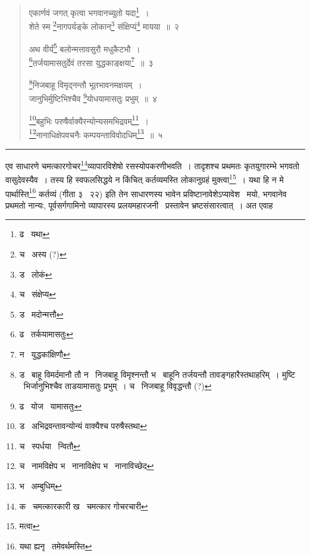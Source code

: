 \documentclass[11pt, openany]{book}
\begin{document}
\begin{quote}
{\na एकार्णवं जगत् कृत्वा भगवानच्युतो यदा\renewcommand{\thefootnote}{1}\footnote{ढ \textendash\ यथा}~।\\
शेते स्म \renewcommand{\thefootnote}{2}\footnote{च \textendash\ अस्य (?)}नागपर्यङ्के लोकान्\renewcommand{\thefootnote}{3}\footnote{ड \textendash\ लोकं} संक्षिप्यं\renewcommand{\thefootnote}{4}\footnote{च \textendash\ संक्षेप्य} मायया~॥~२

अथ वीर्यं\renewcommand{\thefootnote}{5}\footnote{ड \textendash\ मदोन्मत्तौ} बलोन्मत्तावसुरौ मधुकैटभौ~।\\
\renewcommand{\thefootnote}{6}\footnote{ढ \textendash\ तर्कयामासतुः}तर्जयामासतुर्देवं तरसा युद्धकाङ्क्षया\renewcommand{\thefootnote}{7}\footnote{न \textendash\ युद्धकांक्षिणौ}~॥~३

\renewcommand{\thefootnote}{8}\footnote{ड \textendash\ बाहू विमर्दमानौ तौ न \textendash\ निजबाहू विमृश्नन्तौ भ \textendash\ बाहूनि तर्जयन्तौ तावङ्गहारैस्तथाहरिम्~। मुष्टि \textendash\ भिर्जानुभिश्चैव ताडयामासतुः प्रभुम्~। च \textendash\ निजबाहू विवृद्धन्तौ (?)}निजबाहू विमृद्नन्तौ भूतभावनमक्षयम्~।\\
जानुभिर्मुष्टिभिश्चैव \renewcommand{\thefootnote}{9}\footnote{ढ \textendash\ योज \textendash\ यामासतुः}योधयामासतुः प्रभुम्~॥~४

\renewcommand{\thefootnote}{10}\footnote{ड \textendash\ अभिद्रवन्तावन्योन्यं वाक्यैश्च परुषैस्तथा}बहुभिः परुषैर्वाक्यैरन्योन्यसमभिद्रवम्\renewcommand{\thefootnote}{11}\footnote{च \textendash\ स्पर्धया \textendash\ न्वितौ}~।\\
\renewcommand{\thefootnote}{12}\footnote{च \textendash\ नामविक्षेप भ \textendash\ नानाविक्षेप भ \textendash\ नानाविच्छेद}नानाधिक्षेपवचनैः कम्पयन्ताविवोदधिम्\renewcommand{\thefootnote}{13}\footnote{भ \textendash\ अम्बुधिम्}~॥~५}
\end{quote}

\hrule

\vspace{2mm}
\noindent
एव साधारणे चमत्कारगोचर\renewcommand{\thefootnote}{1}\footnote{क \textendash\ चमत्कारकारी ख \textendash\ चमत्कार गोचरचारी}व्यापारविशेषो रसस्योपकरणीभवति~। तादृशश्च प्रथमतः कृतयुगारम्भे भगवतो वासुदेवस्यैव~। तस्य हि स्वफलसिद्धये न किंचित् कर्तव्यमस्ति लोकानुग्रहं मुक्त्वा\renewcommand{\thefootnote}{2}\footnote{मत्वा}~। यथा हि {\qt न मे पार्थास्ति\renewcommand{\thefootnote}{3}\footnote{यथा ह्यनृ \textendash\ तमेवर्थमस्ति} कर्तव्यं (गीता ३ \textendash\ २२)} इति तेन साधारणस्य भावेन प्रविष्टानावेशेऽप्यावेश \textendash\ मयो, भगवानेव प्रथमतो नान्यः, पूर्वसर्गगामिनो व्यापारस्य प्रलयमहारजनी \textendash\ प्रस्तावेन भ्रष्टसंसारत्वात्~। अत एवाह \textendash
\end{document}
